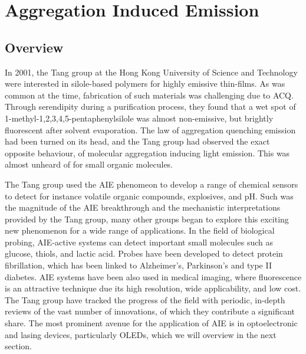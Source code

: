 \section{Aggregation Induced Emission}\label{section: lom AIE}
\subsection{Overview}
In 2001, the Tang group at the Hong Kong University of Science and Technology were interested in silole-based polymers for highly emissive thin-films. As was common at the time, fabrication of such materials was challenging due to \ac{ACQ}. Through serendipity during a purification process, they found that a wet spot of 1-methyl-1,2,3,4,5-pentaphenylsilole was almost non-emissive, but brightly fluorescent after solvent evaporation.\cite{Luo2001} The law of aggregation quenching emission had been turned on its head, and the Tang group had observed the exact opposite behaviour, of molecular aggregation inducing light emission. This was almost unheard of for small organic molecules. 

The Tang group used the \ac{AIE} phenomeon to develop a range of chemical sensors to detect for instance volatile organic compounds, explosives, and pH.\cite{Dong2007,Li2005,Li2009} Such was the magnitude of the \ac{AIE} breakthrough and the mechanistic interpretations provided by the Tang group, many other groups began to explore this exciting new phenomenon for a wide range of applications. In the field of biological probing, \ac{AIE}-active systems can detect important small molecules such as glucose, thiols, and lactic acid.\cite{Wang2014,Yuan2014,Shen2012} Probes have been developed to detect protein fibrillation, which has been linked to Alzheimer's, Parkinson's and type II diabetes.\cite{Hong2012} \ac{AIE} systems have been also used in medical imaging, where fluorescence is an attractive technique due its high resolution, wide applicability, and low cost.\cite{Mei2015} The Tang group have tracked the progress of the field with periodic, in-depth reviews of the vast number of innovations, of which they contribute a significant share.\cite{Hong2009,Wang2010a,Hong2011,Mei2014,Hu2014,Mei2015} The most prominent avenue for the application of AIE is in optoelectronic and lasing devices, particularly OLEDs, which we will overview in the next section. 
